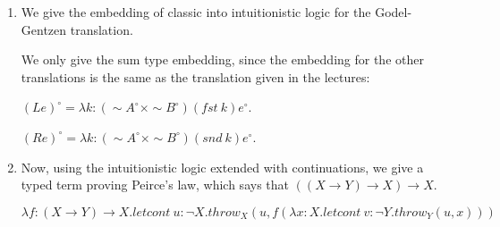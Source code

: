 


    \begin{enumerate}
      \item

        We give the embedding of classic into intuitionistic logic for the Godel-Gentzen translation.
        

        We only give the sum type embedding, since the embedding for the other translations is the same as the translation given in the lectures:

        $(L e)^\circ = \lambda k: (\sim A^\circ \times \sim B^\circ) (fst\ k) e^\circ$.

        $(R e)^\circ = \lambda k: (\sim A^\circ \times \sim B^\circ) (snd\ k) e^\circ$.

      \item
        Now, using the intuitionistic logic extended with continuations, we give a typed term proving Peirce's law, which says that $((X \rightarrow Y) \rightarrow X) \rightarrow X$.

        $\lambda f : (X \rightarrow Y)\rightarrow X. letcont\ u: \neg X. throw_X(u, f (\lambda x : X. letcont\ v : \neg Y. throw_Y(u, x)))$

    \end{enumerate}

